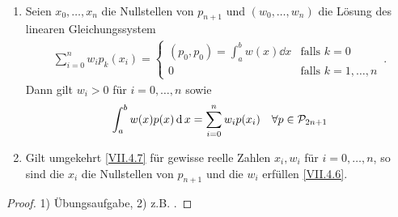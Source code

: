 \begin{Satze}\label{7.4.8}~
  \begin{enumerate}[1)]
  \item Seien $x_0,\dotsc, x_n$ die Nullstellen von $p_{n+1}$ 
    und $(w_0,\dotsc,w_n)$ die Lösung des linearen Gleichungssystem
    \begin{gather}
      \sum_{i=0}^{n}w_ip_k(x_i) 
      = \begin{cases}
        (p_0,p_0)=\int_a^b w(x)\dd x & \text{falls } k=0 \\
        0 & \text{falls } k=1,\dotsc,n
      \end{cases}\,.
      \label{VII.4.6}
     \end{gather}
     Dann gilt $w_i>0$ für $i= 0,\dotsc,n$ sowie
     \begin{gather}
       \int_a^bw(x)p(x)\operatorname{d} x = \sum_{i=0}^n w_ip(x_i) 
       \quad \forall p\in\mathcal{P}_{2n+1}
       \label{VII.4.7}
     \end{gather}
   \item Gilt umgekehrt \eqref{VII.4.7} 
     für gewisse reelle Zahlen $x_i,w_i$ für $i=0,\dotsc,n$,
     so sind die $x_i$ die Nullstellen von $p_{n+1}$ 
     und die $w_i$ erfüllen \eqref{VII.4.6}.
   \end{enumerate}
   
   \begin{proof}
      1) Übungsaufgabe, 2) z.B. \cite{stoer}.
   \end{proof}
\end{Satze}

